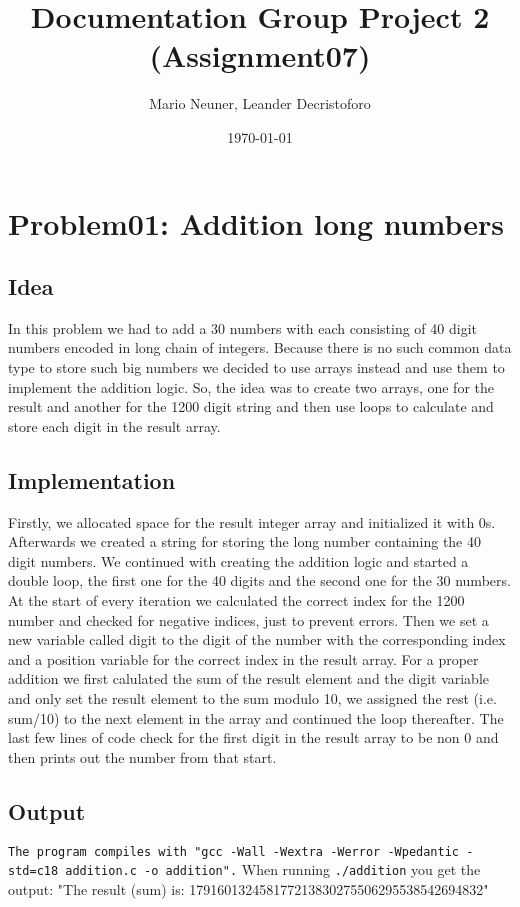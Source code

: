 \documentclass[12pt,a4paper]{article}
\title{Documentation Group Project 2 (Assignment07)}
\author{Mario Neuner, Leander Decristoforo}
\date{\today}
\begin{document}
\maketitle
\tableofcontents
\pagebreak


\section{Problem01: Addition long numbers}
\vspace{0pt}
\subsection{Idea}
In this problem we had to add a 30 numbers with each consisting of 40 digit numbers encoded in long chain
of integers. Because there is no such common data type to store such big numbers we decided to use arrays
instead and use them to implement the addition logic. So, the idea was to create two arrays, one for the result 
and another for the 1200 digit string and then use loops to calculate and store each digit in the result array.
\newline

\subsection{Implementation}
Firstly, we allocated space for the result integer array and initialized it with 0s. Afterwards we created a 
string for storing the long number containing the 40 digit numbers. We continued with creating the addition 
logic and started a double loop, the first one for the 40 digits and the second one for the 30 numbers. At the
start of every iteration we calculated the correct index for the 1200 number and checked for negative indices, just
to prevent errors. Then we set a new variable called digit to the digit of the number with the corresponding index 
and a position variable for the correct index in the result array. For a proper addition we first calulated the sum
of the result element and the digit variable and only set the result element to the sum modulo 10, we assigned 
the rest (i.e. sum/10) to the next element in the array and continued the loop thereafter. The last few lines of code
check for the first digit in the result array to be non 0 and then prints out the number from that start.
\newline

\subsection{Output}
\texttt{The program compiles with "gcc -Wall -Wextra -Werror -Wpedantic -std=c18 addition.c -o addition".}
When running \texttt{./addition} you get the output: 
\newline
"The result (sum) is:
179160132458177213830275506295538542694832"
\newline
\end{document}
